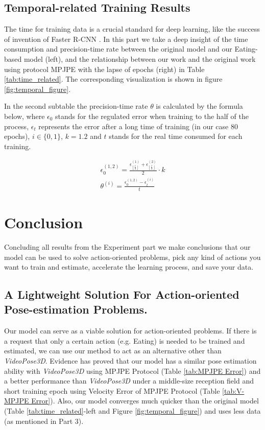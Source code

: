 \documentclass[10pt,twocolumn,letterpaper]{article}
\begin{document}
\subsection{Temporal-related Training Results}

The time for training data is a crucial standard for deep learning, like the success of invention of Faster R-CNN
\cite{Ren2015}. In this part we take a deep insight of the time consumption and precision-time rate between the 
original model and our Eating-based model (left), and the relationship between our work 
and the original work using protocol MPJPE with the lapse of epochs (right) in Table \ref{tab:time_related}. The 
corresponding visualization is shown in figure \ref{fig:temporal_figure}.

In the second subtable the precision-time rate $\theta$ is calculated by the formula below, where $\epsilon_0$ stands
for the regulated error when training to the half of the process, $\epsilon_t$ represents the error 
after a long time of training (in our case 80 epochs), $i\in\{0,1\}$, $k=1.2$ and $t$ stands for the real time consumed for each training.

\begin{gather}
	\epsilon_0^{(1,2)}=\frac{\epsilon_{\left\lfloor\frac{t}{2}\right\rfloor}^{(1)}+\epsilon_{\left\lfloor\frac{t}{2}\right\rfloor}^{(2)}}{2}\cdot k \\
	\theta^{(i)} = \frac{\epsilon_0^{(1,2)} - \epsilon_t^{(i)}}{t}		
\end{gather}

\section{Conclusion}

Concluding all results from the Experiment part we make conclusions that our model can be used to solve action-oriented problems, pick any kind of actions you want to
train and estimate, accelerate the learning process, and save your data.

\subsection{A Lightweight Solution For Action-oriented Pose-estimation Problems.}
Our model can serve as a viable solution for action-oriented problems. If there is a request that only a certain action (e.g. Eating) is needed to be trained
and estimated, we can use our method to act as an alternative other than \textit{VideoPose3D}. Evidence has proved that our model has a similar pose estimation ability
with \textit{VideoPose3D} using MPJPE Protocol (Table \ref{tab:MPJPE Error}) and a better performance than \textit{VideoPose3D} under a middle-size reception field
and short training epoch using Velocity Error of MPJPE Protocol (Table \ref{tab:V-MPJPE Error}). Also, our model converges much quicker than the original model
(Table \ref{tab:time_related}-left and Figure \ref{fig:temporal_figure}) and uses less data (as mentioned in Part 3).
\end{document}

